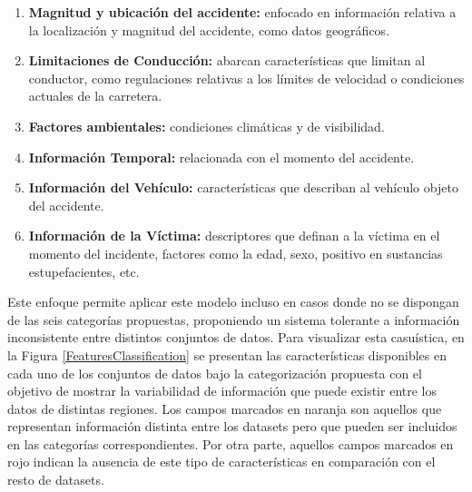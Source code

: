 \documentclass{uathesis-es}
\begin{document}
{\begin{enumerate}
    \item \textbf{Magnitud y ubicación del accidente:} enfocado en información relativa a la localización y magnitud del accidente, como datos geográficos.
    \item \textbf{Limitaciones de Conducción:} abarcan características que limitan al conductor, como regulaciones relativas a los límites de velocidad o condiciones actuales de la carretera.
    \item \textbf{Factores ambientales:} condiciones climáticas y de visibilidad.
    \item \textbf{Información Temporal:} relacionada con el momento del accidente.
    \item \textbf{Información del Vehículo:} características que describan al vehículo objeto del accidente.
    \item \textbf{Información de la Víctima:} descriptores que definan a la víctima en el momento del incidente, factores como la edad, sexo, positivo en sustancias estupefacientes, etc.
\end{enumerate}

Este enfoque permite aplicar este modelo incluso en casos donde no se dispongan de las seis categorías propuestas, proponiendo un sistema tolerante a información inconsistente entre distintos conjuntos de datos. Para visualizar esta casuística, en la Figura \ref{FeaturesClassification} se presentan las características disponibles en cada uno de los conjuntos de datos bajo la categorización propuesta con el objetivo de mostrar la variabilidad de información que puede existir entre los datos de distintas regiones. Los campos marcados en naranja son aquellos que representan información distinta entre los datasets pero que pueden ser incluidos en las categorías correspondientes. Por otra parte, aquellos campos marcados en rojo indican la ausencia de este tipo de características en comparación con el resto de datasets.

}
\end{document}
